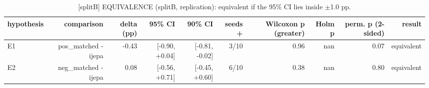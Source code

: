 \begin{table}[t]
\centering
\small
\caption{[splitB] EQUIVALENCE (splitB, replication): equivalent if the 95\% CI lies inside $\pm$1.0 pp.}
\label{tab:equivalence_comparisons}
\begin{tabular}{lrrrrrrrrr}
\toprule
hypothesis & comparison & delta (pp) & 95\% CI & 90\% CI & seeds + & Wilcoxon p (greater) & Holm p & perm. p (2-sided) & result \\
\midrule
E1 & pos\_matched - ijepa & -0.43 & [-0.90, +0.04] & [-0.81, -0.02] & 3/10 & 0.96 & nan & 0.07 & equivalent \\
E2 & neg\_matched - ijepa & 0.08 & [-0.56, +0.71] & [-0.45, +0.60] & 6/10 & 0.38 & nan & 0.80 & equivalent \\
\bottomrule
\end{tabular}
\end{table}
